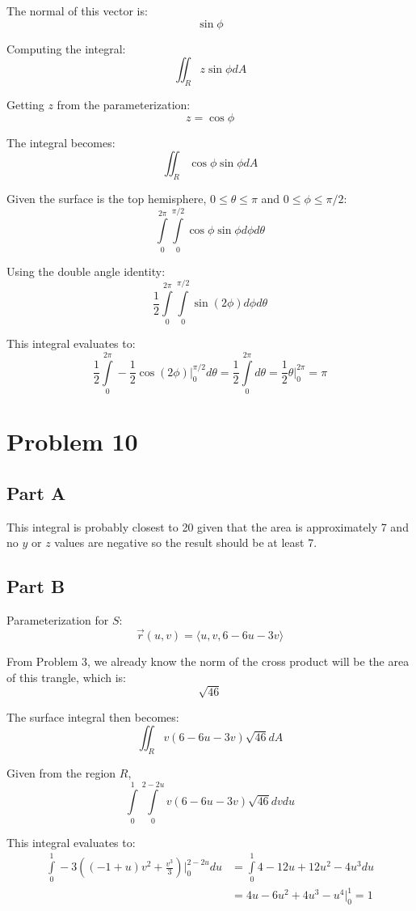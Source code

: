 \documentclass{article}
\begin{document}
The normal of this vector is:
$$ \sin \phi $$

Computing the integral:
$$ \iint_R z \sin \phi dA$$

Getting $z$ from the parameterization:
$$ z = \cos \phi $$
 
The integral becomes:
$$ \iint_R \cos \phi \sin \phi dA $$

Given the surface is the top hemisphere, $0 \leq \theta \leq \pi$ and $0 \leq
\phi \leq \pi / 2$:
$$ \int\limits_0^{2\pi}\int\limits_0^{\pi/2} \cos \phi \sin \phi d\phi d\theta
$$

Using the double angle identity:
$$ \frac{1}{2} \int\limits_0^{2\pi}\int\limits_0^{\pi/2} \sin(2\phi) d\phi
d\theta $$

This integral evaluates to:
$$ \frac{1}{2} \int\limits_0^{2\pi} -\frac{1}{2} \cos(2\phi) \bigg\vert_0^{\pi/2} d\theta
= \frac{1}{2} \int\limits_0^{2\pi} d\theta = \frac{1}{2} \theta \bigg\vert_0^{2\pi} = \pi $$

\section*{Problem 10}

\subsection*{Part A}

This integral is probably closest to 20 given that the area is approximately 7
and no $y$ or $z$ values are negative so the result should be at least 7.

\subsection*{Part B}

Parameterization for $S$:
$$ \vec{r}(u, v) = \langle u, v, 6 - 6u - 3v \rangle $$

From Problem 3, we already know the norm of the cross product will be the area
of this trangle, which is:
$$ \sqrt{46} $$

The surface integral then becomes:
$$ \iint_R v (6 - 6u - 3v) \sqrt{46} dA $$

Given from the region $R$,
$$ \int\limits_0^1\int\limits_0^{2-2u} v (6 - 6u - 3v) \sqrt{46} dv du $$

This integral evaluates to:
\begin{align*}
\int\limits_0^1 -3\left( (-1 +u)v^2+\frac{v^3}{3} \right) \bigg\vert_0^{2-2u}
  du &= \int\limits_0^1 4 - 12 u +12 u^2 - 4 u ^3 du \\ &= 4u - 6u^2 + 4u^3 - u^4
\bigg\vert_0^1 = 1
\end{align*}
\end{document}
